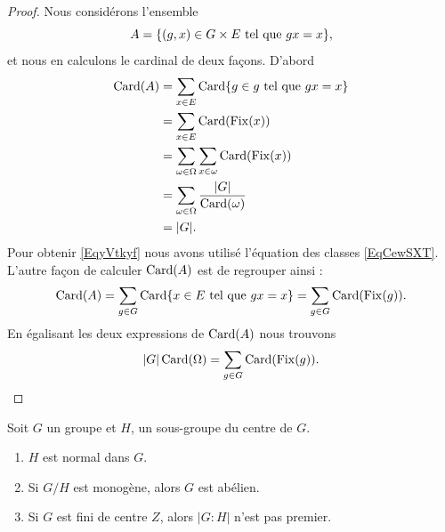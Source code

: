 \begin{proof}
    Nous considérons l'ensemble
    \begin{equation}
        A=\{ (g,x)\in G\times E\text{ tel que } gx=x \},
    \end{equation}
    et nous en calculons le cardinal de deux façons. D'abord
    \begin{subequations}
        \begin{align}
            \operatorname{Card}(A)&=\sum_{x\in E}\operatorname{Card}\{ g\in g\text{ tel que } gx=x \}\\
            &=\sum_{x\in E}\operatorname{Card}(\operatorname{Fix}(x))\\
            &=\sum_{\omega\in \Omega}\sum_{x\in \omega}\operatorname{Card}(\operatorname{Fix}(x))\\
            &=\sum_{\omega\in \Omega}\frac{ | G | }{ \operatorname{Card}(\omega) }     \label{EqyVtkyf}\\
            &=| G |.
        \end{align}
    \end{subequations}
    Pour obtenir \eqref{EqyVtkyf} nous avons utilisé l'équation des classes \eqref{EqCewSXT}. L'autre façon de calculer \( \operatorname{Card}(A)\) est de regrouper ainsi :
    \begin{equation}
        \operatorname{Card}(A)=\sum_{g\in G}\operatorname{Card}\{ x\in E\text{ tel que } gx=x \}=\sum_{g\in G}\operatorname{Card}(\operatorname{Fix}(g)).
    \end{equation}
    En égalisant les deux expressions de \( \operatorname{Card}(A)\) nous trouvons
    \begin{equation}
        | G |\operatorname{Card}(\Omega)=\sum_{g\in G}\operatorname{Card}(\operatorname{Fix}(g)).
    \end{equation}
\end{proof}

\begin{proposition}
    Soit \( G\) un groupe et \( H\), un sous-groupe du centre de \( G\).
    \begin{enumerate}
        \item
            \( H\) est normal dans \( G\).
        \item
            Si \( G/H\) est monogène, alors \( G\) est abélien.
        \item
            Si \( G\) est fini de centre \( Z\), alors \( | G:H |\) n'est pas premier.
    \end{enumerate}
\end{proposition}


